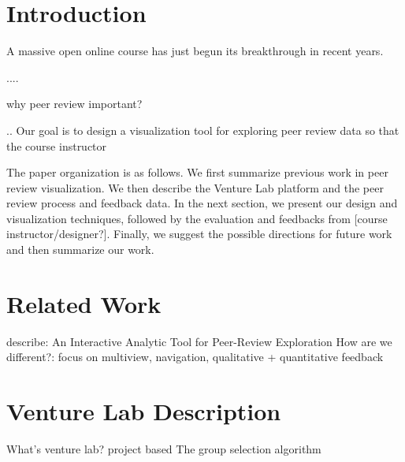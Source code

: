\documentclass{sigchi}
\begin{document}


\section{Introduction}
A massive open online course has just begun its breakthrough in recent years.

....

why peer review important?

..
Our goal is to design a visualization tool for exploring peer review data so that the course instructor 

The paper organization is as follows. We first summarize previous work in peer review visualization. We then describe the Venture Lab platform and the peer review process and feedback data. In the next section, we present our design and visualization techniques, followed by the evaluation and feedbacks from [course instructor/designer?]. Finally, we suggest the possible directions for future work and then summarize our work.

\section{Related Work}
describe: An Interactive Analytic Tool for Peer-Review Exploration
How are we different?: focus on multiview, navigation, qualitative + quantitative feedback

\section{Venture Lab Description}
What's venture lab? project based
The group selection algorithm
\end{document}

